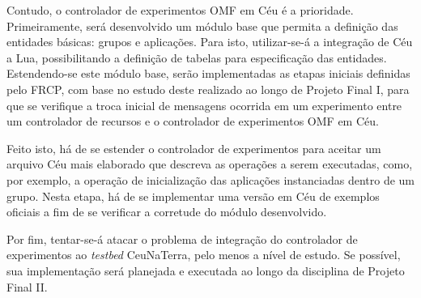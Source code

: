 Contudo, o controlador de experimentos OMF em Céu é a prioridade. Primeiramente, será desenvolvido um módulo base que permita a definição das entidades básicas: grupos e aplicações. Para isto, utilizar-se-á a integração de Céu a Lua, possibilitando a definição de tabelas para especificação das entidades. Estendendo-se este módulo base, serão implementadas as etapas iniciais definidas pelo FRCP, com base no estudo deste realizado ao longo de Projeto Final I, para que se verifique a troca inicial de mensagens ocorrida em um experimento entre um controlador de recursos e o controlador de experimentos OMF em Céu.

Feito isto, há de se estender o controlador de experimentos para aceitar um arquivo Céu mais elaborado que descreva as operações a serem executadas, como, por exemplo, a operação de inicialização das aplicações instanciadas dentro de um grupo. Nesta etapa, há de se implementar uma versão em Céu de exemplos oficiais a fim de se verificar a corretude do módulo desenvolvido.

Por fim, tentar-se-á atacar o problema de integração do controlador de experimentos ao \textit{testbed} CeuNaTerra, pelo menos a nível de estudo. Se possível, sua implementação será planejada e executada ao longo da disciplina de Projeto Final II.
